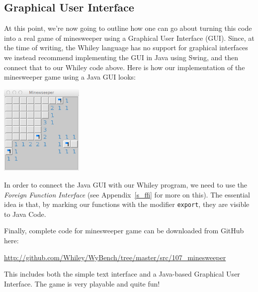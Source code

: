 \subsection{Graphical User Interface}
At this point, we're now going to outline how one can go about turning this code into a real game of minesweeper using a Graphical User Interface (GUI).  Since, at the time of writing, the Whiley language has no support for graphical interfaces we instead recommend implementing the GUI in Java using Swing, and then connect that to our Whiley code above.  Here is how our implementation of the minesweeper game using a Java GUI looks:
\begin{center}
\includegraphics[width=0.3\textwidth]{../images/minesweeper.png}
\end{center}

In order to connect the Java GUI with our Whiley program, we need to use the {\em Foreign Function Interface} (see Appendix~\ref{s_ffi} for more on this).  The essential idea is that, by marking our functions with the modifier \lstinline{export}, they are visible to Java Code.  

Finally, complete code for minesweeper game can be downloaded from GitHub here: 
\begin{center}
\url{http://github.com/Whiley/WyBench/tree/master/src/107_minesweeper}
\end{center}
This includes both the simple text interface and a Java-based Graphical User Interface.  The game is very playable and quite fun!
